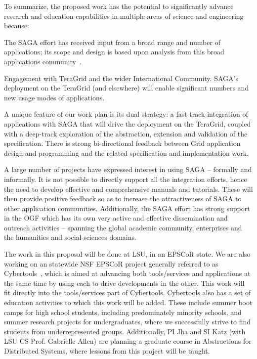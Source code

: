 \documentclass[10pt,letterpaper]{article}
\begin{document}
To summarize, the proposed work has the potential to significantly
advance research and education capabilities in multiple areas of
science and engineering because:
\begin{shortlist}
\item The SAGA effort has received input from a broad range and number
  of applications; its scope and design is based upon analysis from
  this broad applications community~\cite{saga-req}.
\item Engagement with TeraGrid and the wider International Community.
  SAGA's deployment on the TeraGrid (and elsewhere) will enable
  significant numbers and new usage modes of applications.
\item A unique feature of our work plan is its dual strategy: a
  fast-track integration of applications with SAGA that
  will drive the deployment on the TeraGrid, coupled with a deep-track
  exploration of the abstraction, extension and validation of the
  specification.  There is strong bi-directional feedback between Grid
  application design and programming and the related specification and
  implementation work.
\item A large number of projects have expressed interest in using
  SAGA -- formally and informally. It is not possible to directly
  support all the integration efforts, hence the need to develop
  effective and comprehensive manuals and tutorials. These will then
  provide positive feedback so as to increase the attractiveness of
  SAGA to other application communities. Additionally, the SAGA effort
  has strong support in the OGF which has its own very active and
  effective dissemination and outreach activities -- spanning the
  global academic community, enterprises and the humanities and
  social-sciences %
  domains.
\end{shortlist}

The work in this proposal will be done at LSU, in an EPSCoR state.  We
are also working on an statewide NSF EPSCoR project generally referred
to as Cybertools~\cite{cybertools_url}, which is aimed at advancing
both tools/services and applications at the same time by using each to
drive developments in the other.  This work will fit directly into the
tools/services part of Cybertools.  Cybertools also has a set of
education activities to which this work will be added.  These include
summer boot camps for high school students, including predominately
minority schools, and summer research projects for undergraduates,
where we successfully strive to find students from underrepresented
groups.  Additionally, PI Jha and SI Katz (with LSU CS Prof. Gabrielle
Allen) are planning a graduate course in Abstractions for
Distributed Systems, where lessons from this project will be taught.
\end{document}
